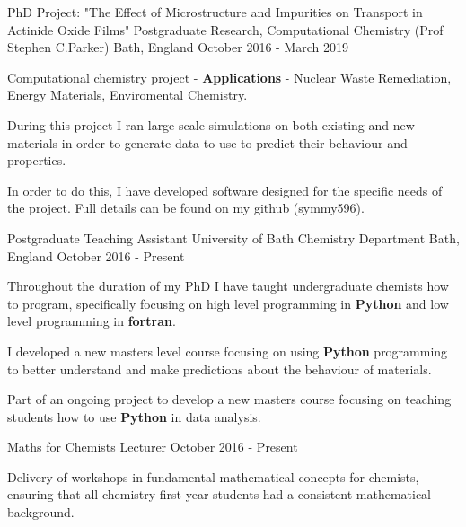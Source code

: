 \begin{cventries}
  \cventry
    {PhD Project: "The Effect of Microstructure and Impurities on Transport in Actinide Oxide Films"}
    {Postgraduate Research, Computational Chemistry (Prof Stephen C.Parker)}
    {Bath, England}
    {October 2016 - March 2019}
    {
      \begin{cvitems}
        \item{Computational chemistry project - \textbf{Applications} - Nuclear Waste Remediation, Energy Materials, Enviromental Chemistry.}
		    \item{During this project I ran large scale simulations on both existing and new materials in order to generate data to use to predict their behaviour and properties.}
		    \item{In order to do this, I have developed software designed for the specific needs of the project. Full details can be found on my github (symmy596).}
      \end{cvitems}
    }

  \cventry
    {Postgraduate Teaching Assistant}
    {University of Bath Chemistry Department}    
    {Bath, England}
    {October 2016 - Present}
    {
      \begin{cvitems}
        \item{Throughout the duration of my PhD I have taught undergraduate chemists how to program, specifically focusing on high level programming in \textbf{Python} and low level programming in \textbf{fortran}.}
        \item{I developed a new masters level course focusing on using \textbf{Python} programming to better understand and make predictions about the behaviour of materials.}
        \item{Part of an ongoing project to develop a new masters course focusing on teaching students how to use \textbf{Python} in data analysis.}
      \end{cvitems}
    }

  \cventry   
    {Maths for Chemists Lecturer}
    {}
    {}
    {October 2016 - Present}
    {
      \begin{cvitems}
        \item
        {Delivery of workshops in fundamental mathematical concepts for chemists, ensuring that all chemistry first year students had a consistent mathematical background.} 
      \end{cvitems}
    }
\end{cventries}
